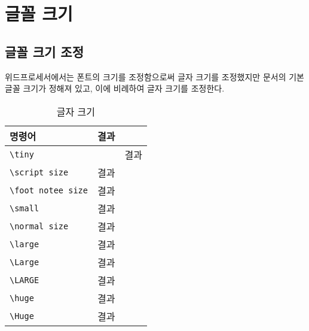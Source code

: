 


%
%







\newpage  
\chapter{글꼴 크기}

		\minitoc				%

		
	\clearpage
	\section{글꼴 크기 조정}
	\null
	
	
		위드프로세서에서는 폰트의 크기를 조정함으로써 글자 크기를 조정했지만 
		문서의 기본 글꼴 크기가 정해져 있고, 이에 비례하여 글자 크기를 조정한다.
		
		
			\begin{table}[hbp]
			\caption{글자 크기}
			\centering
			\begin{tabular}{l  l  l }
			\toprule
			명령어 & 결과 \\
			\toprule
			\verb|\tiny|				&  &\normalsize{결과}\\
			\verb||		& \scriptsize{결과} \\
			\verb|\foot notee size| 	& \footnotesize{결과} \\
			\verb|\small|			& \small{결과} \\
			\verb|| 		& \normalsize{결과} \\
			\verb|\large| 			& \large{결과} \\
			\verb|\Large| 			& \Large{결과} \\
			\verb|\LARGE| 			& \LARGE{결과} \\
			\verb|\huge| 			& \huge{결과} \\
			\verb|\Huge| 			& \Huge{결과} \\
			\bottomrule
			\end{tabular}%
			\end{table}%
			
